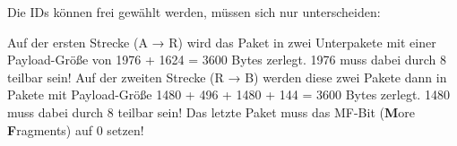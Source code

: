 
Die IDs können frei gewählt werden, müssen sich nur unterscheiden:

\begin{flushleft}
\end{flushleft}
\bigbreak

Auf der ersten Strecke (A → R) wird das Paket in zwei Unterpakete mit einer Payload-Größe von 1976 + 1624 = 3600 Bytes zerlegt.
1976 muss dabei durch 8 teilbar sein!
Auf der zweiten Strecke (R → B) werden diese zwei Pakete dann in Pakete mit Payload-Größe 1480 + 496 + 1480 + 144 = 3600 Bytes zerlegt.
1480 muss dabei durch 8 teilbar sein!
Das letzte Paket muss das MF-Bit (\textbf{M}ore \textbf{F}ragments) auf 0 setzen!
